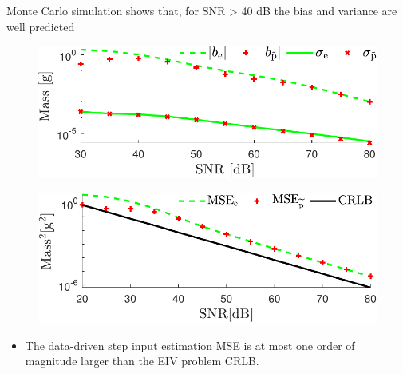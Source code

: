 \documentclass[presentation]{beamer}
\begin{document}
\begin{frame}[label={slide:experimental-validation3}]{Monte Carlo simulation shows that, for SNR > 40 dB \linebreak the bias and variance are well predicted}
\begin{figure}
 \centering
 \includegraphics[width=0.65\columnwidth]{./fig/Exp_Fig_2.pdf} 
\end{figure}
\begin{figure}
 \centering
 \includegraphics[width=0.65\columnwidth]{./fig/Exp_Fig_3.pdf} 
\end{figure}
\begin{itemize}
	\color{blue}
	\item The data-driven step input estimation MSE is at most \linebreak one order of magnitude larger than the EIV problem CRLB.
\end{itemize}
\end{frame}
\end{document}
